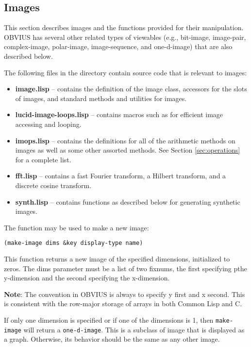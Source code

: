 \subsection{Images}
\label{sec:images}

This section describes images and the functions provided for their
manipulation.  OBVIUS has several other related types of viewables
(e.g., bit-image, image-pair, complex-image, polar-image,
image-sequence, and one-d-image) that are also described below.

The following files in the   directory contain source
code that is relevant to images:
\begin{itemize}
\item {\bf image.lisp} --  contains the definition of the
image class, accessors for the slots of images, and standard methods
and utilities for images.
\item {\bf lucid-image-loops.lisp} -- contains macros such as 
 for efficient image accessing and looping.
\item {\bf imops.lisp} -- contains the definitions for all
of the arithmetic methods on images as well as some other assorted
methods.  See Section \ref{sec:operations} for a complete list.
\item {\bf fft.lisp} -- contains a fast Fourier transform, a Hilbert transform,
and a discrete cosine transform.
\item {\bf synth.lisp} -- contains functions as described below for
generating synthetic images.
\end{itemize}


The function  may be used to make a new image:
\begin{verbatim}
(make-image dims &key display-type name)
\end{verbatim}
This function returns a new image of the specified dimensions,
initialized to zeros.  The dims parameter must be a list of two
fixnums, the first specifying pthe y-dimension and the second
specifying the x-dimension.

{\bf Note}: The convention in OBVIUS is always to specify y first and
x second.  This is consistent with the row-major storage of arrays in
both Common Lisp and C.

If only one dimension is specified or if one of the dimensions is 1,
then {\tt make-image} will return a {\tt one-d-image}.  This is a
subclass of image that is displayed as a graph.  Otherwise, its
behavior should be the same as any other image.

